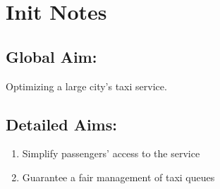 \section{Init Notes}

\subsection{Global Aim:} Optimizing a large city's taxi service.

\subsection{Detailed Aims:} \begin{enumerate}
\item Simplify passengers' access to the service
\item Guarantee a fair management of taxi queues
\end{enumerate}

